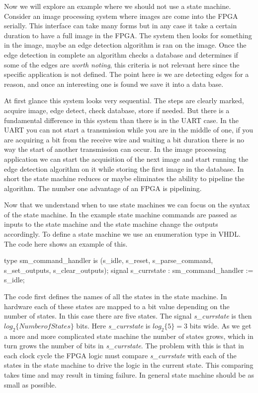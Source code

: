 Now we will explore an example where we should not use a state machine. Consider an image processing system where images are come into the \ac{FPGA} serially. This interface can take many forms but in any case it take a certain duration to have a full image in the \ac{FPGA}. The system then looks for something in the image, maybe an edge detection algorithm is ran on the image. Once the edge detection in complete an algorithm checks a database and determines if some of the edges are \emph{worth noting}, this criteria is not relevant here since the specific application is not defined. The point here is we are detecting edges for a reason, and once an interesting one is found we save it into a data base. 

At first glance this system looks very sequential. The steps are clearly marked, acquire image, edge detect, check database, store if needed. But there is a fundamental difference in this system than there is in the \ac{UART} case. In the \ac{UART} you can not start a transmission while you are in the middle of one, if you are acquiring a bit from the receive wire and waiting a bit duration there is no way the start of another transmission can occur. In the image processing application we can start the acquisition of the next image and start running the edge detection algorithm on it while storing the first image in the database. In short the state machine reduces or maybe eliminates the ability to pipeline the algorithm. The number one advantage of an \ac{FPGA} is pipelining.

Now that we understand when to use state machines we can focus on the syntax of the state machine. In the example state machine commands are passed as inputs to the state machine and the state machine change the outputs accordingly. To define a state machine we use an enumeration type in \ac{VHDL}. The code here shows an example of this. 

\begin{VHDLlisting}[tabsize=4]
type sm_command_handler is (s_idle, 
                            s_reset, 
                            s_parse_command, 
                            s_set_outputs, 
                            s_clear_outputs);
signal s_currstate : sm_command_handler := s_idle;
\end{VHDLlisting}

The code first defines the names of all the states in the state machine. In hardware each of these states are mapped to a bit value depending on the number of states. In this case there are five states. The signal \emph{s\_currstate} is then $log_2\{{Number of States}\}$ bits. Here \emph{s\_currstate} is $log_2\{5\}=3$ bits wide. As we get a more and more complicated state machine the number of states grows, which in turn grows the number of bits in \emph{s\_currstate}. The problem with this is that in each clock cycle the \ac{FPGA} logic must compare \emph{s\_currstate} with each of the states in the state machine to drive the logic in the current state. This comparing takes time and may result in timing failure. In general state machine should be as small as possible.

